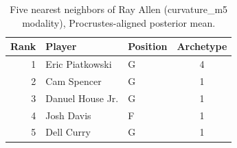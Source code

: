 \begin{table}[htbp]
  \centering\small
  \begin{tabular}{rllc}
    \toprule
    Rank & Player & Position & Archetype \\
    \midrule
    1 & Eric Piatkowski & G & 4 \\
    2 & Cam Spencer & G & 1 \\
    3 & Danuel House Jr. & G & 1 \\
    4 & Josh Davis & F & 1 \\
    5 & Dell Curry & G & 1 \\
    \bottomrule
  \end{tabular}
  \caption{Five nearest neighbors of Ray Allen (curvature_m5 modality), Procrustes-aligned posterior mean.}
  \label{tab:Ray_Allen_neighbors_curvature_m5}
\end{table}

